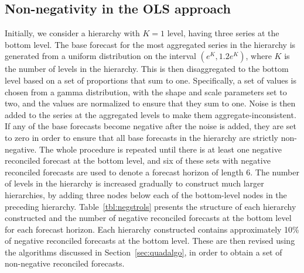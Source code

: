 \documentclass[11pt]{article}
\newcommand{\0}{\phantom{0}}
\begin{document}
\subsection{Non-negativity in the OLS approach}
\label{sec:nonnegols}

Initially, we consider a hierarchy with $K=1$ level, having three series at the bottom level. The base forecast for the most aggregated series in the hierarchy is generated from a uniform distribution on the interval $(e^{K}, 1.2e^{K})$, where $K$ is the number of levels in the hierarchy. This is then disaggregated to the bottom level based on a set of proportions that sum to one. Specifically, a set of values is chosen from a gamma distribution, with the shape and scale parameters set to two, and the values are normalized to ensure that they sum to one. Noise is then added to the series at the aggregated levels to make them aggregate-inconsistent. If any of the base forecasts become negative after the noise is added, they are set to zero in order to ensure that all base forecasts in the hierarchy are strictly non-negative. The whole procedure is repeated until there is at least one negative reconciled forecast at the bottom level, and six of these sets with negative reconciled forecasts are used to denote a forecast horizon of length 6. The number of levels in the hierarchy is increased gradually to construct much larger hierarchies, by adding three nodes below each of the bottom-level nodes in the preceding hierarchy. Table~\ref{tbl:negstrols} presents the structure of each hierarchy constructed and the number of negative reconciled forecasts at the bottom level for each forecast horizon. Each hierarchy constructed contains approximately 10\% of negative reconciled forecasts at the bottom level. These are then revised using the algorithms discussed in Section~\ref{sec:quadalgo}, in order to obtain a set of non-negative reconciled forecasts.
\end{document}
